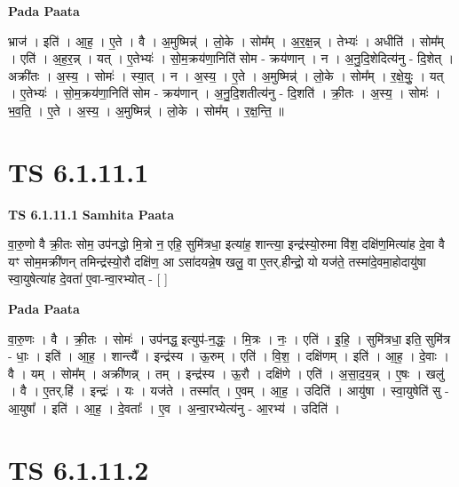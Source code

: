 \documentclass[17pt]{extarticle}
\begin{document}
\textbf{Pada Paata} \newline

भ्राज॑ । इति॑ । आ॒ह॒ । ए॒ते । वै । अ॒मुष्मिन्न्॑ । लो॒के । सोम᳚म् । अ॒र॒क्ष॒न्न् । तेभ्यः॑ । अधीति॑ । सोम᳚म् । एति॑ । अ॒ह॒र॒न्न् । यत् । ए॒तेभ्यः॑ । सो॒म॒क्रय॑णा॒निति॑ सोम - क्रय॑णान् । न । अ॒नु॒दि॒शेदित्य॑नु - दि॒शेत् । अक्री॑तः । अ॒स्य॒ । सोमः॑ । स्या॒त् । न । अ॒स्य॒ । ए॒ते । अ॒मुष्मिन्न्॑ । लो॒के । सोम᳚म् । र॒क्षे॒युः॒ । यत् । ए॒तेभ्यः॑ । सो॒म॒क्रय॑णा॒निति॑ सोम - क्रय॑णान् । अ॒नु॒दि॒शतीत्य॑नु - दि॒शति॑ । क्री॒तः । अ॒स्य॒ । सोमः॑ । भ॒व॒ति॒ । ए॒ते । अ॒स्य॒ । अ॒मुष्मिन्न्॑ । लो॒के । सोम᳚म् । र॒क्ष॒न्ति॒ ॥  \newline




\section*{ TS 6.1.11.1 }

\textbf{TS 6.1.11.1 } \newline
\textbf{Samhita Paata} \newline

वा॒रु॒णो वै क्री॒तः सोम॒ उप॑नद्धो मि॒त्रो न॒ एहि॒ सुमि॑त्रधा॒ इत्या॑ह॒ शान्त्या॒ इन्द्र॑स्यो॒रुमा वि॑श॒ दक्षि॑ण॒मित्या॑ह दे॒वा वै यꣳ सोम॒मक्री॑णन् तमिन्द्र॑स्यो॒रौ दक्षि॑ण॒ आ ऽसा॑दयन्ने॒ष खलु॒ वा ए॒तर्.हीन्द्रो॒ यो यज॑ते॒ तस्मा॑दे॒वमा॒होदायु॑षा स्वा॒युषेत्या॑ह दे॒वता॑ ए॒वा-न्वा॒रभ्योत् - [  ] \newline

\textbf{Pada Paata} \newline

वा॒रु॒णः । वै । क्री॒तः । सोमः॑ । उप॑नद्ध॒ इत्युप॑-न॒द्धः॒ । मि॒त्रः । नः॒ । एति॑ । इ॒हि॒ । सुमि॑त्रधा॒ इति॒ सुमि॑त्र - धाः॒ । इति॑ । आ॒ह॒ । शान्त्यै᳚ । इन्द्र॑स्य । ऊ॒रुम् । एति॑ । वि॒श॒ । दक्षि॑णम् । इति॑ । आ॒ह॒ । दे॒वाः । वै । यम् । सोम᳚म् । अक्री॑णन्न् । तम् । इन्द्र॑स्य । ऊ॒रौ । दक्षि॑णे । एति॑ । अ॒सा॒द॒य॒न्न् । ए॒षः । खलु॑ । वै । ए॒तर्.हि॑ । इन्द्रः॑ । यः । यज॑ते । तस्मा᳚त् । ए॒वम् । आ॒ह॒ । उदिति॑ । आयु॑षा । स्वा॒युषेति॑ सु - आ॒युषा᳚ । इति॑ । आ॒ह॒ । दे॒वताः᳚ । ए॒व । अ॒न्वा॒रभ्येत्य॑नु - आ॒रभ्य॑ । उदिति॑ ।  \newline




\section*{ TS 6.1.11.2 }
\end{document}
